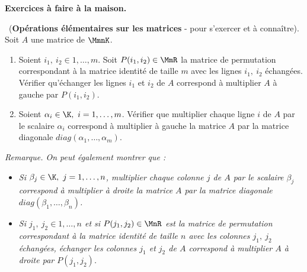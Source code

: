 
\centerline{{\bf Exercices à faire à la maison.}}

\begin{exo}\ ({\bf Opérations élémentaires sur les matrices} - pour s'exercer et à connaître). \\
  Soit $A$ une matrice de $\MmnK$.
  \begin{enumerate}
\item Soient $i_1,\ i_2\in{1,\dots,m}$. Soit $P(i_1,i_2)\in\MmR$ la matrice de permutation correspondant à la matrice identité de taille $m$ avec les lignes $i_1,\ i_2$ échangées. Vérifier qu'échanger les lignes $i_1$ et $i_2$ de $A$ correspond à multiplier $A$ à gauche par $P(i_1,i_2)$.
\item Soient $\alpha_i\in\K,\ i=1,\dots,m$. Vérifier que multiplier chaque ligne $i$ de $A$ par le scalaire $\alpha_i$ correspond à multiplier à gauche la matrice $A$ par la matrice diagonale $diag(\alpha_1,\dots,\alpha_m)$.
  \end{enumerate}
  {\it Remarque. On peut également montrer que :}
  \begin{itemize}
\item    {\it Si $\beta_j\in\K,\ j=1,\dots,n$, multiplier chaque colonne $j$ de $A$ par le scalaire $\beta_j$ correspond à multiplier à droite la matrice $A$ par la matrice diagonale $diag(\beta_1,\dots,\beta_n)$.}
\item {\it Si $j_1,\ j_2\in{1,\dots,n}$ et si $P(j_1,j_2)\in\MnR$ est la matrice de permutation correspondant à la matrice identité de taille $n$ avec les colonnes $j_1,\ j_2$ échangées, échanger les colonnes $j_1$ et $j_2$ de $A$ correspond à multiplier $A$ à droite par $P(j_1,j_2)$.}
\end{itemize}
\end{exo}


